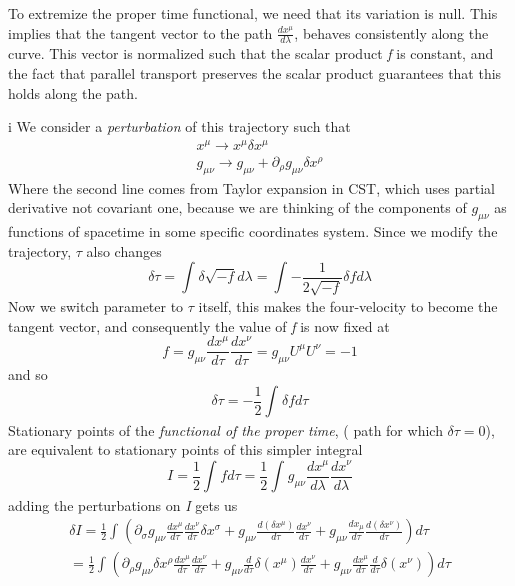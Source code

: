 To extremize the proper time functional, we need that its variation is null. This implies that the tangent vector to the path $\frac{d x^{\mu }}{d \lambda }$, behaves consistently along the curve. This vector is normalized such that the scalar product \emph{f} is constant, and the fact that parallel transport preserves the scalar product guarantees that this holds along the path.\par
i%
We consider a \emph{perturbation} of this trajectory such that
\begin{gather*}
x^{\mu  }\to x^{\mu }\delta x^{\mu } \\
g_{\mu \nu } \to  g_{\mu \nu } + \partial_{\rho }g_{\mu \nu } \delta  x^{\rho }
\end{gather*}
Where the second line comes from Taylor expansion in CST, which uses partial derivative not covariant one, because we are thinking of the components of $g_{\mu \nu }$ as functions of spacetime in some specific coordinates system.
Since we modify the trajectory, $\tau$ also changes
\[
	\delta \tau = \int_{}^{}{\delta \sqrt{-f}d\lambda } = \int_{}^{}{-\frac{1}{2\sqrt{-f}}\delta f d\lambda }
\]
Now we switch parameter to $\tau $ itself, this makes the four-velocity to become the tangent vector, and consequently the value of \emph{f} is now fixed at 
\[
f = g_{\mu \nu }\frac{d x^{\mu }}{d \tau }\frac{d x^{\nu }}{d \tau } = g_{\mu \nu }U^{\mu }U^{\nu } = -1
\]
and so
\[
\delta \tau = -\frac{1}{2} \int_{}^{}{\delta f d\tau }
\]
Stationary points of the \emph{functional of the proper time}, ( path for which $\delta  \tau =0$), are equivalent to stationary points of this simpler integral
\[
I = \frac{1}{2} \int_{}^{}{f d\tau } = \frac{1}{2} \int_{}^{}{g_{\mu \nu }\frac{d x^{\mu }}{d \lambda }\frac{d x^{\nu }}{d \lambda }}
\]
adding the perturbations on \emph{I} gets us
\begin{gather}\label{eq:deltaI}
\delta I = \frac{1}{2} \int_{}^{}{\left( \partial_{\sigma }g_{\mu \nu }\frac{d x^{\mu }}{d \tau }\frac{d x^{\nu }}{d \tau }\delta x^{\sigma } + g_{\mu \nu } \frac{d \left( \delta x^{\mu } \right)}{d \tau }\frac{d x^{\nu }}{d \tau } + g_{\mu \nu }\frac{d x_{\mu }}{d \tau } \frac{d \left(\delta  x^{\nu } \right)}{d \tau } \right)d\tau } \\
= \frac{1}{2} \int_{}^{}{\left( \partial_{\rho }g_{\mu \nu }\delta x^{\rho } \frac{d x^{\mu }}{d \tau } \frac{d x^{\nu }}{d \tau } +  g_{\mu \nu }\frac{d }{d \tau } \delta \left( x^{\mu } \right) \frac{d x^{\nu }}{d \tau } + g_{\mu \nu } \frac{d x^{\mu }}{d \tau } \frac{d }{d \tau } \delta \left( x^{\nu } \right) \right) d\tau }
\end{gather}
